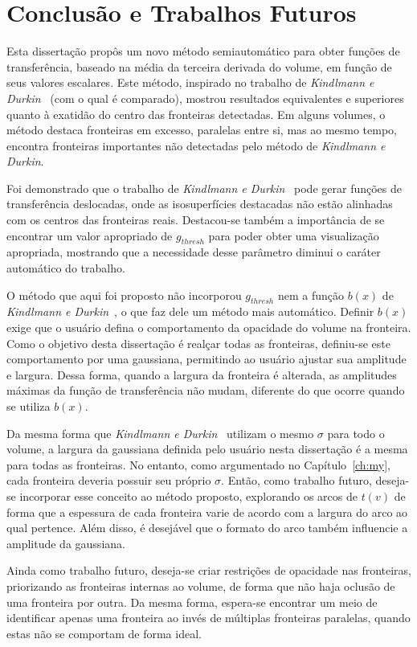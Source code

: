 
\chapter{Conclusão e Trabalhos Futuros}
\label{ch:conclusion}
	Esta dissertação propôs um novo método semiautomático para obter funções de transferência, baseado na média da terceira derivada do volume, em função de seus valores escalares. Este método, inspirado no trabalho de \textit{Kindlmann e Durkin}~\cite{gordon} (com o qual é comparado), mostrou resultados equivalentes e superiores quanto à exatidão do centro das fronteiras detectadas. Em alguns volumes, o método destaca fronteiras em excesso, paralelas entre si, mas ao mesmo tempo, encontra fronteiras importantes não detectadas pelo método de \textit{Kindlmann e Durkin}.

	Foi demonstrado que o trabalho de \textit{Kindlmann e Durkin}~\cite{gordon} pode gerar funções de transferência deslocadas, onde as isosuperfícies destacadas não estão alinhadas com os centros das fronteiras reais. Destacou-se também a importância de se encontrar um valor apropriado de $ g_{thresh} $ para poder obter uma visualização apropriada, mostrando que a necessidade desse parâmetro diminui o caráter automático do trabalho.
	
	O método que aqui foi proposto não incorporou $ g_{thresh} $ nem a função $ b(x) $ de \textit{Kindlmann e Durkin}~\cite{gordon}, o que faz dele um método mais automático. Definir $ b(x) $ exige que o usuário defina o comportamento da opacidade do volume na fronteira. Como o objetivo desta dissertação é realçar todas as fronteiras, definiu-se este comportamento por uma gaussiana, permitindo ao usuário ajustar sua amplitude e largura. Dessa forma, quando a largura da fronteira é alterada, as amplitudes máximas da função de transferência não mudam, diferente do que ocorre quando se utiliza $ b(x) $.
	
	Da mesma forma que \textit{Kindlmann e Durkin}~\cite{gordon} utilizam o mesmo $ \sigma $ para todo o volume, a largura da gaussiana definida pelo usuário nesta dissertação é a mesma para todas as fronteiras. No entanto, como argumentado no Capítulo~\ref{ch:my}, cada fronteira deveria possuir seu próprio $ \sigma $. Então, como trabalho futuro, deseja-se incorporar esse conceito ao método proposto, explorando os arcos de $ t(v) $ de forma que a espessura de cada fronteira varie de acordo com a largura do arco ao qual pertence. Além disso, é desejável que o formato do arco também influencie a amplitude da gaussiana.
	
	Ainda como trabalho futuro, deseja-se criar restrições de opacidade nas fronteiras, priorizando as fronteiras internas ao volume, de forma que não haja oclusão de uma fronteira por outra. Da mesma forma, espera-se encontrar um meio de identificar apenas uma fronteira ao invés de múltiplas fronteiras paralelas, quando estas não se comportam de forma ideal.
